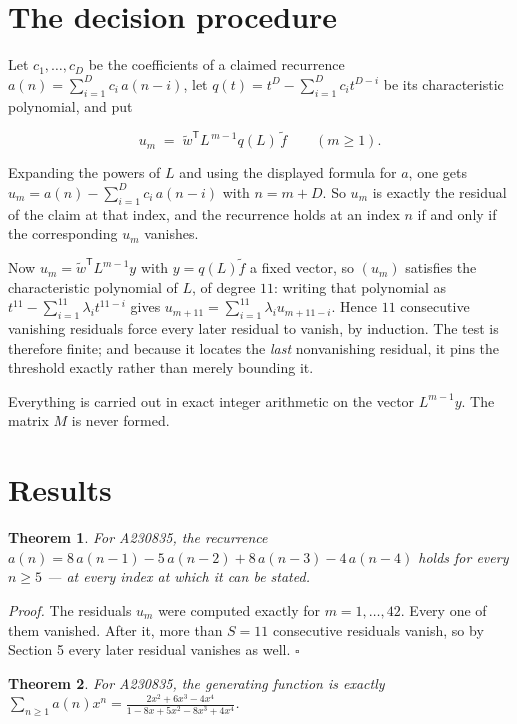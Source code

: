 \documentclass[11pt]{article}
\newtheorem{theorem}{Theorem}
\theoremstyle{definition}
\begin{document}
\section{The decision procedure}

Let $c_1,\dots,c_D$ be the coefficients of a claimed recurrence $a(n) = \sum_{i=1}^{D} c_i\,a(n-i)$, let $q(t) = t^{D} - \sum_{i=1}^{D} c_i t^{D-i}$ be its characteristic polynomial, and put

\[u_m \;=\; \tilde w^{\mathsf T} L^{\,m-1} q(L)\,\tilde f \qquad (m \ge 1).\]

Expanding the powers of $L$ and using the displayed formula for $a$, one gets $u_m = a(n) - \sum_{i=1}^{D} c_i\,a(n-i)$ with $n = m + D$. So $u_m$ is exactly the residual of the claim at that index, and the recurrence holds at an index $n$ if and only if the corresponding $u_m$ vanishes.

Now $u_m = \tilde w^{\mathsf T} L^{m-1} y$ with $y = q(L)\tilde f$ a fixed vector, so $(u_m)$ satisfies the characteristic polynomial of $L$, of degree $11$: writing that polynomial as $t^{11} - \sum_{i=1}^{11} \lambda_i t^{11-i}$ gives $u_{m+11} = \sum_{i=1}^{11} \lambda_i u_{m+11-i}$. Hence $11$ consecutive vanishing residuals force every later residual to vanish, by induction. The test is therefore finite; and because it locates the {\itshape last} nonvanishing residual, it pins the threshold exactly rather than merely bounding it.

Everything is carried out in exact integer arithmetic on the vector $L^{m-1}y$. The matrix $M$ is never formed.

\section{Results}

\begin{theorem} For A230835, the recurrence $a(n) = 8\,a(n-1) - 5\,a(n-2) + 8\,a(n-3) - 4\,a(n-4)$ holds for every $n \ge 5$ --- at every index at which it can be stated.\end{theorem}

{\itshape Proof.} The residuals $u_m$ were computed exactly for $m = 1,\dots,42$. Every one of them vanished. After it, more than $S = 11$ consecutive residuals vanish, so by Section 5 every later residual vanishes as well. $\square$

\begin{theorem} For A230835, the generating function is exactly $\sum_{n\ge 1} a(n)x^n = \frac{2x^{2} + 6x^{3} - 4x^{4}}{1 - 8x + 5x^{2} - 8x^{3} + 4x^{4}}$.\end{theorem}
\end{document}

